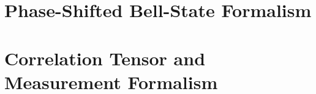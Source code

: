\documentclass[a4paper,12pt]{report}
\begin{document}
\chapter{Phase-Shifted Bell-State Formalism}




\chapter{Correlation Tensor and Measurement Formalism}




%
% 
%

%
% 
%

%
% 
\end{document}
